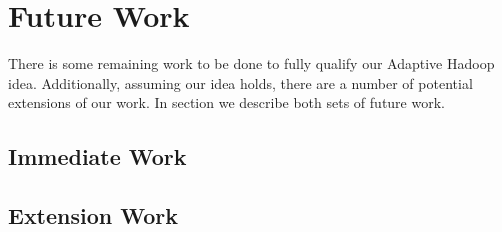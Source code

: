 \section{Future Work}
\label{section:futurework}

There is some remaining work to be done to fully qualify our Adaptive Hadoop idea. Additionally, 
assuming our idea holds, there are a number of potential extensions of our work. In section we
describe both sets of future work.

\subsection{Immediate Work}

\subsection{Extension Work}
